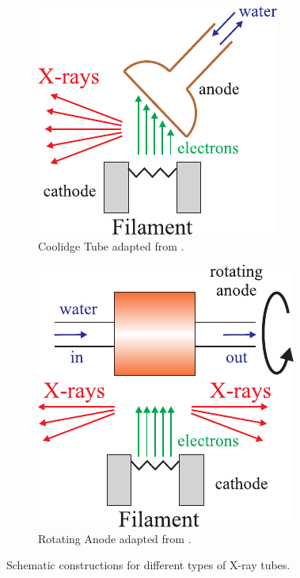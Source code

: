 \begin{figure}[H]
	\begin{subfigure}{0.5\textwidth}
		\centering
		\includegraphics{content/graphics/CoolidgeTube.pdf}
		\caption{Coolidge Tube adapted from \cite{McMorrow_2011_2}.}
		\label{fig:tube1}
	\end{subfigure}
	\hfill
	\begin{subfigure}{0.5\textwidth}
		\centering
		\includegraphics{content/graphics/RotatingAnode.pdf}
		\caption{Rotating Anode adapted from \cite{McMorrow_2011_2}.}
		\label{fig:tube2}
	\end{subfigure}
	\caption{Schematic constructions for different types of X-ray tubes.}
	\label{fig:tube}
\end{figure}

